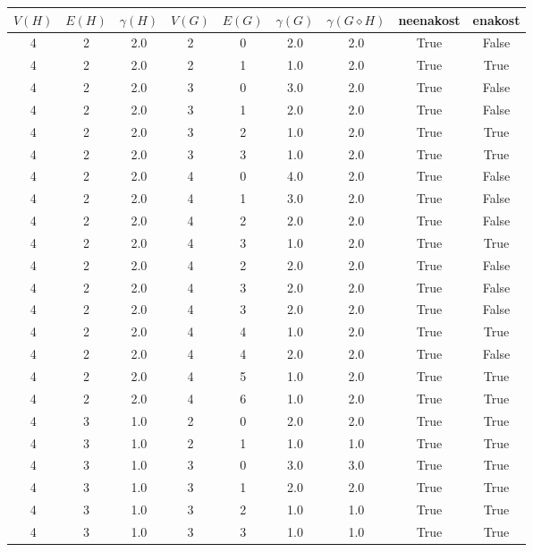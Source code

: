 \documentclass[a4paper,12pt]{article}
\begin{document}
\begin{center}
    \begin{tabular}{ c c c | c c c | c | c | c}
        $V(H)$ & $E(H)$ & $\gamma(H)$ & $V(G)$ & $E(G)$ & $\gamma(G)$ & $\gamma(G \diamond H)$ & neenakost & enakost \\
        \hline
        4 & 2 & 2.0 & 2 & 0 & 2.0 & 2.0 & True & False    \\
        4 & 2 & 2.0 & 2 & 1 & 1.0 & 2.0 & True & True     \\
        4 & 2 & 2.0 & 3 & 0 & 3.0 & 2.0 & True & False    \\
        4 & 2 & 2.0 & 3 & 1 & 2.0 & 2.0 & True & False    \\
        4 & 2 & 2.0 & 3 & 2 & 1.0 & 2.0 & True & True     \\
        4 & 2 & 2.0 & 3 & 3 & 1.0 & 2.0 & True & True     \\
        4 & 2 & 2.0 & 4 & 0 & 4.0 & 2.0 & True & False    \\
        4 & 2 & 2.0 & 4 & 1 & 3.0 & 2.0 & True & False    \\
        4 & 2 & 2.0 & 4 & 2 & 2.0 & 2.0 & True & False    \\
        4 & 2 & 2.0 & 4 & 3 & 1.0 & 2.0 & True & True     \\
        4 & 2 & 2.0 & 4 & 2 & 2.0 & 2.0 & True & False    \\
        4 & 2 & 2.0 & 4 & 3 & 2.0 & 2.0 & True & False    \\
        4 & 2 & 2.0 & 4 & 3 & 2.0 & 2.0 & True & False    \\
        4 & 2 & 2.0 & 4 & 4 & 1.0 & 2.0 & True & True     \\
        4 & 2 & 2.0 & 4 & 4 & 2.0 & 2.0 & True & False    \\
        4 & 2 & 2.0 & 4 & 5 & 1.0 & 2.0 & True & True     \\
        4 & 2 & 2.0 & 4 & 6 & 1.0 & 2.0 & True & True     \\
        4 & 3 & 1.0 & 2 & 0 & 2.0 & 2.0 & True & True     \\
        4 & 3 & 1.0 & 2 & 1 & 1.0 & 1.0 & True & True     \\
        4 & 3 & 1.0 & 3 & 0 & 3.0 & 3.0 & True & True     \\
        4 & 3 & 1.0 & 3 & 1 & 2.0 & 2.0 & True & True     \\
        4 & 3 & 1.0 & 3 & 2 & 1.0 & 1.0 & True & True     \\
        4 & 3 & 1.0 & 3 & 3 & 1.0 & 1.0 & True & True     \\

\end{tabular}
\end{center}
\end{document}
